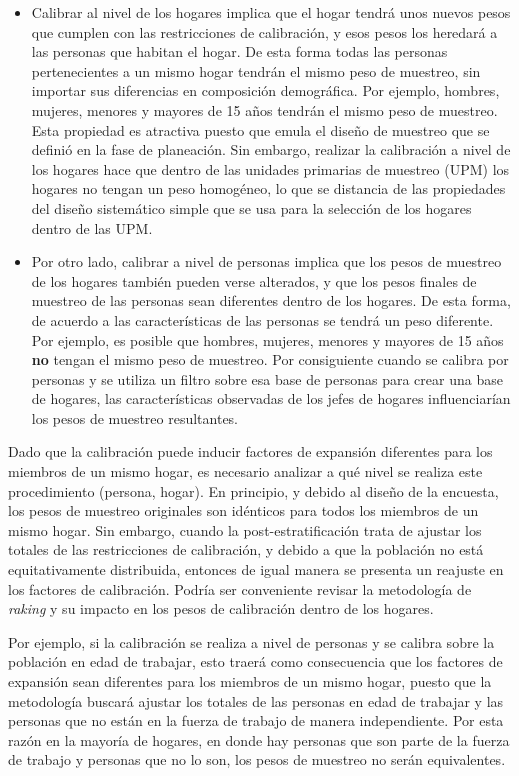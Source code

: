 \documentclass[
  10pt,
  spanish,
]{book}
\begin{document}
\begin{itemize}
\item
  Calibrar al nivel de los hogares implica que el hogar tendrá unos nuevos pesos que cumplen con las restricciones de calibración, y esos pesos los heredará a las personas que habitan el hogar. De esta forma todas las personas pertenecientes a un mismo hogar tendrán el mismo peso de muestreo, sin importar sus diferencias en composición demográfica. Por ejemplo, hombres, mujeres, menores y mayores de 15 años tendrán el mismo peso de muestreo. Esta propiedad es atractiva puesto que emula el diseño de muestreo que se definió en la fase de planeación. Sin embargo, realizar la calibración a nivel de los hogares hace que dentro de las unidades primarias de muestreo (UPM) los hogares no tengan un peso homogéneo, lo que se distancia de las propiedades del diseño sistemático simple que se usa para la selección de los hogares dentro de las UPM.
\item
  Por otro lado, calibrar a nivel de personas implica que los pesos de muestreo de los hogares también pueden verse alterados, y que los pesos finales de muestreo de las personas sean diferentes dentro de los hogares. De esta forma, de acuerdo a las características de las personas se tendrá un peso diferente. Por ejemplo, es posible que hombres, mujeres, menores y mayores de 15 años \textbf{no} tengan el mismo peso de muestreo. Por consiguiente cuando se calibra por personas y se utiliza un filtro sobre esa base de personas para crear una base de hogares, las características observadas de los jefes de hogares influenciarían los pesos de muestreo resultantes.
\end{itemize}

Dado que la calibración puede inducir factores de expansión diferentes para los miembros de un mismo hogar, es necesario analizar a qué nivel se realiza este procedimiento (persona, hogar). En principio, y debido al diseño de la encuesta, los pesos de muestreo originales son idénticos para todos los miembros de un mismo hogar. Sin embargo, cuando la post-estratificación trata de ajustar los totales de las restricciones de calibración, y debido a que la población no está equitativamente distribuida, entonces de igual manera se presenta un reajuste en los factores de calibración. Podría ser conveniente revisar la metodología de \emph{raking} y su impacto en los pesos de calibración dentro de los hogares.

Por ejemplo, si la calibración se realiza a nivel de personas y se calibra sobre la población en edad de trabajar, esto traerá como consecuencia que los factores de expansión sean diferentes para los miembros de un mismo hogar, puesto que la metodología buscará ajustar los totales de las personas en edad de trabajar y las personas que no están en la fuerza de trabajo de manera independiente. Por esta razón en la mayoría de hogares, en donde hay personas que son parte de la fuerza de trabajo y personas que no lo son, los pesos de muestreo no serán equivalentes.
\end{document}
